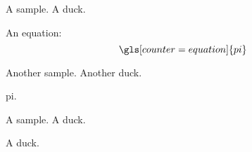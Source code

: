 \documentclass{article}
\begin{document}
A \gls{sample}. \lipsum*[1] A \gls{duck}.

An equation:
\begin{equation}
\gls[counter=equation]{pi}
\end{equation}

\lipsum[2]

Another \gls{sample}. \lipsum*[3] Another \gls{duck}.

\gls{pi}. \lipsum[4]

A \gls{sample}. \lipsum*[5] A \gls{duck}.

\lipsum*[6] A \gls{duck}.

\printunsrtglossaries
\end{document}
